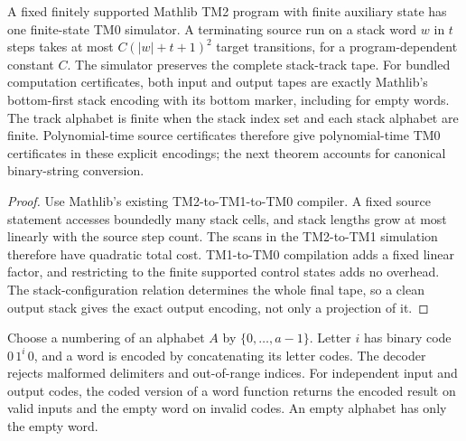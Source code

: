 \begin{theorem}
  \label{thm:mathlib-tm2-efficient-compiler}
  \leanok
  A fixed finitely supported Mathlib TM2 program with finite auxiliary state
  has one finite-state TM0 simulator. A terminating source run on a stack word
  $w$ in $t$ steps takes at most $C(|w|+t+1)^2$ target transitions, for a
  program-dependent constant $C$. The simulator preserves the complete
  stack-track tape. For bundled computation certificates, both input and output
  tapes are exactly Mathlib's bottom-first stack encoding with its bottom marker,
  including for empty words. The track alphabet is finite when the stack index
  set and each stack alphabet are finite. Polynomial-time source certificates
  therefore give polynomial-time TM0 certificates in these explicit encodings;
  the next theorem accounts for canonical binary-string conversion.
\end{theorem}
\begin{proof}
  \leanok
  Use Mathlib's existing TM2-to-TM1-to-TM0 compiler. A fixed source statement
  accesses boundedly many stack cells, and stack lengths grow at most linearly
  with the source step count. The scans in the TM2-to-TM1 simulation therefore
  have quadratic total cost. TM1-to-TM0 compilation adds a fixed linear factor,
  and restricting to the finite supported control states adds no overhead.
  The stack-configuration relation determines the whole final tape, so a clean
  output stack gives the exact output encoding, not only a projection of it.
\end{proof}

\begin{definition}
  \label{def:finite-alphabet-code}
  \leanok
  Choose a numbering of an alphabet $A$ by $\{0,\ldots,a-1\}$.
  Letter $i$ has binary code $0\,1^i\,0$, and a word is encoded by
  concatenating its letter codes. The decoder rejects malformed delimiters
  and out-of-range indices. For independent input and output codes, the coded
  version of a word function returns the encoded result on valid inputs and
  the empty word on invalid codes. An empty alphabet has only the empty word.
\end{definition}

